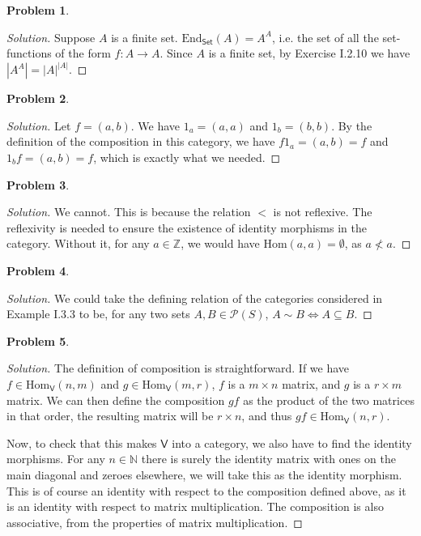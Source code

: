 \documentclass{article}
\theoremstyle{definition}
\newtheorem{problem-internal}{Problem}[subsection]
\newenvironment{problem}{
	\medskip
	\begin{problem-internal}
	}{
\end{problem-internal}
}
\newenvironment{solution}{
	\begin{proof}[Solution]
		\vspace{-8px}
		\setlength{\parskip}{4px}
		\setlength{\parindent}{0px}
	}{
\end{proof}
}
\newcommand{\Hom}{\mathrm{Hom}}
\newcommand{\abs}[1]{\left|#1\right|}
\newcommand{\Cset}{\mathsf{Set}}
\begin{document}
\begin{problem}
\end{problem}

\begin{solution}
	Suppose $A$ is a finite set. $\mathrm{End}_{\Cset}(A) = A^A$, i.e. the set of all the set-functions of the form $f: A \to A$. Since $A$ is a finite set, by Exercise I.2.10 we have $\abs{A^A}=\abs{A}^{\abs{A}}$.
\end{solution}

\begin{problem}
\end{problem}

\begin{solution}
	Let $f = (a,b)$. We have $1_a = (a,a)$ and $1_b = (b,b)$. By the definition of the composition in this category, we have $f1_a = (a,b) = f$ and $1_bf = (a,b) = f$, which is exactly what we needed.
\end{solution}

\begin{problem}
\end{problem}

\begin{solution}
	We cannot. This is because the relation $<$ is not reflexive. The reflexivity is needed to ensure the existence of identity morphisms in the category. Without it, for any $a \in \mathbb{Z}$, we would have $\Hom(a,a) = \emptyset$, as $a \not < a$.
\end{solution}

\begin{problem}
\end{problem}

\begin{solution}
	We could take the defining relation of the categories considered in Example I.3.3 to be, for any two sets $A,B \in \mathcal{P}(S)$, $A \sim B \iff A \subseteq B$.
\end{solution}

\begin{problem}
\end{problem}

\begin{solution}
	The definition of composition is straightforward. If we have $f \in \Hom_{\mathsf{V}}(n,m)$ and $g \in \Hom_{\mathsf{V}}(m,r)$, $f$ is a $m \times n$ matrix, and $g$ is a $r \times m$ matrix. We can then define the composition $gf$ as the product of the two matrices in that order, the resulting matrix will be $r \times n$, and thus $gf \in \Hom_{\mathsf{V}}(n,r)$.
	
	Now, to check that this makes $\mathsf{V}$ into a category, we also have to find the identity morphisms. For any $n \in \mathbb{N}$ there is surely the identity matrix with ones on the main diagonal and zeroes elsewhere, we will take this as the identity morphism. This is of course an identity with respect to the composition defined above, as it is an identity with respect to matrix multiplication. The composition is also associative, from the properties of matrix multiplication.
\end{solution}
\end{document}
